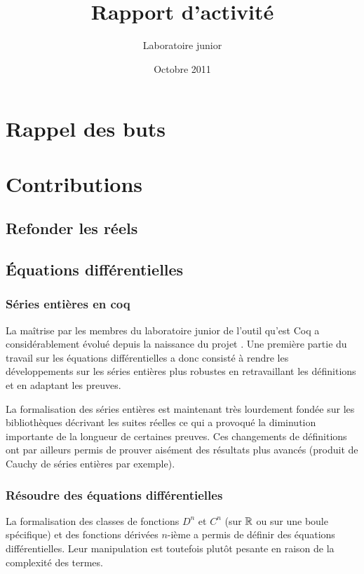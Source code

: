 \documentclass[11pt]{article}
\title{Rapport d'activité}
\author{Laboratoire junior \coqtail{}}
\date{Octobre 2011}
\begin{document}
\maketitle

\section{Rappel des buts}

\section{Contributions}

\subsection{Refonder les réels}

\subsection{Équations différentielles}

\subsubsection{Séries entières en coq}

La maîtrise par les membres du laboratoire junior de l'outil qu'est Coq a
considérablement évolué depuis la naissance du projet \coquille{}. Une première
partie du travail sur les équations différentielles a donc consisté à rendre les
développements sur les séries entières plus robustes en retravaillant les définitions
et en adaptant les preuves.

La formalisation des séries entières est maintenant très lourdement fondée sur les
bibliothèques décrivant les suites réelles ce qui a provoqué la diminution importante
de la longueur de certaines preuves. Ces changements de définitions ont par ailleurs
permis de prouver aisément des résultats plus avancés (produit de Cauchy de séries
entières par exemple).

\subsubsection{Résoudre des équations différentielles}

La formalisation des classes de fonctions $D^n$ et $C^n$ (sur $\mathbb{R}$ ou sur une boule
spécifique) et des fonctions dérivées $n$-ième a permis de définir des équations
différentielles. Leur manipulation est toutefois plutôt pesante en raison de la
complexité des termes.
\end{document}
